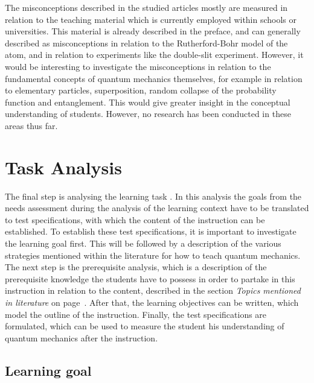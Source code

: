 \documentclass[11pt,twoside]{report} %
\begin{document}
The misconceptions described in the studied articles mostly are measured in relation to the teaching material which is currently employed within schools or universities. This material is already described in the preface, and can generally described as misconceptions in relation to the Rutherford-Bohr model of the atom, and in relation to experiments like the double-slit experiment. However, it would be interesting to investigate the misconceptions in relation to the fundamental concepts of quantum mechanics themselves, for example in relation to elementary particles, superposition, random collapse of the probability function and entanglement. This would give greater insight in the conceptual understanding of students. However, no research has been conducted in these areas thus far.


\chapter{Task Analysis}
\label{ch:taskanalysis}

The final step is analysing the learning task \cite{smithragan}. In this analysis the goals from the needs assessment during the analysis of the learning context have to be translated to test specifications, with which the content of the instruction can be established. To establish these test specifications, it is important to investigate the learning goal first. This will be followed by a description of the various strategies mentioned within the literature for how to teach quantum mechanics. The next step is the prerequisite analysis, which is a description of the prerequisite knowledge the students have to possess in order to partake in this instruction in relation to the content, described in the section \emph{Topics mentioned in literature} on page~\pageref{ssch:topicsliterature}. After that, the learning objectives can be written, which model the outline of the instruction. Finally, the test specifications are formulated, which can be used to measure the student his understanding of quantum mechanics after the instruction.

\section{Learning goal}
\end{document}
